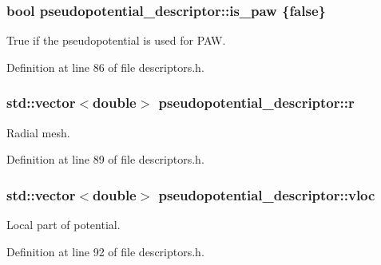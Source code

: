 \subsubsection[{is\+\_\+paw}]{\setlength{\rightskip}{0pt plus 5cm}bool pseudopotential\+\_\+descriptor\+::is\+\_\+paw \{false\}}\label{structpseudopotential__descriptor_a4f218335e6684e55cffb46f33d6ff472}


True if the pseudopotential is used for P\+A\+W. 



Definition at line 86 of file descriptors.\+h.

\hypertarget{structpseudopotential__descriptor_a87d69029e9864672d1a5e45ecc3fc5b2}{}
\subsubsection[{r}]{\setlength{\rightskip}{0pt plus 5cm}std\+::vector$<$double$>$ pseudopotential\+\_\+descriptor\+::r}\label{structpseudopotential__descriptor_a87d69029e9864672d1a5e45ecc3fc5b2}


Radial mesh. 



Definition at line 89 of file descriptors.\+h.

\hypertarget{structpseudopotential__descriptor_a32f0a72237d6c04f33b63b5811352892}{}
\subsubsection[{vloc}]{\setlength{\rightskip}{0pt plus 5cm}std\+::vector$<$double$>$ pseudopotential\+\_\+descriptor\+::vloc}\label{structpseudopotential__descriptor_a32f0a72237d6c04f33b63b5811352892}


Local part of potential. 



Definition at line 92 of file descriptors.\+h.

\hypertarget{structpseudopotential__descriptor_ae4237a6921e6d375f23aedf4c8d523bd}{}
